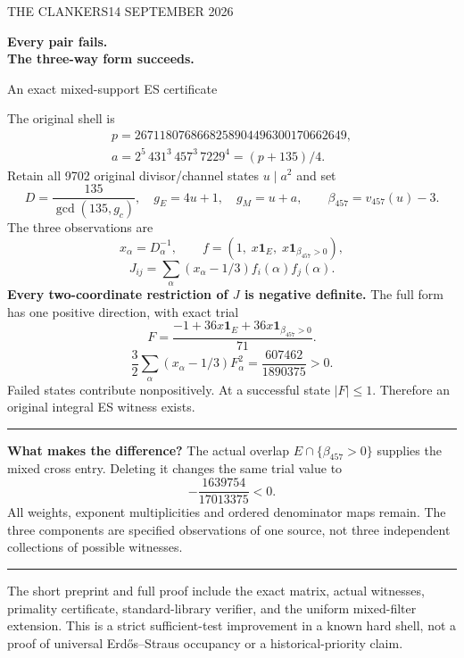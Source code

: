 \documentclass[11pt]{article}
\begin{document}
\noindent\small THE CLANKERS\hfill14 SEPTEMBER 2026
\vspace{5mm}
\begin{center}
{\LARGE\bfseries Every pair fails.\\[2mm]The three-way form succeeds.}\par
\vspace{3mm}
{\large An exact mixed-support ES certificate}
\end{center}
\noindent The original shell is
\[
\begin{gathered}
 p=2671180768668258904496300170662649,\\
 a=2^5\,431^3\,457^3\,7229^4=(p+135)/4.
\end{gathered}
\]
\noindent Retain all 9702 original divisor/channel states $u\mid a^2$ and set
\[
 D=\frac{135}{\gcd(135,g_c)},\quad g_E=4u+1,\quad g_M=u+a,
 \qquad\beta_{457}=v_{457}(u)-3.
\]
\noindent The three observations are
\[
 x_\alpha=D_\alpha^{-1},\qquad
 f=(1,\;x\mathbf1_E,\;x\mathbf1_{\beta_{457}>0}),
\]
\[
 J_{ij}=\sum_\alpha(x_\alpha-1/3)f_i(\alpha)f_j(\alpha).
\]
\noindent\textbf{Every two-coordinate restriction of $J$ is negative definite.}
The full form has one positive direction, with exact trial
\[
 F=\frac{-1+36x\mathbf1_E+36x\mathbf1_{\beta_{457}>0}}{71}.
\]
\[
 \boxed{\frac32\sum_\alpha(x_\alpha-1/3)F_\alpha^2
        =\frac{607462}{1890375}>0.}
\]
\noindent Failed states contribute nonpositively. At a successful state
$|F|\le1$. Therefore an original integral ES witness exists.

\vspace{4mm}\hrule\vspace{4mm}
\noindent\textbf{What makes the difference?}
The actual overlap $E\cap\{\beta_{457}>0\}$ supplies the mixed cross entry.
Deleting it changes the same trial value to
\[
 -\frac{1639754}{17013375}<0.
\]
\noindent All weights, exponent multiplicities and ordered denominator maps remain.
The three components are specified observations of one source, not three
independent collections of possible witnesses.

\vspace{4mm}\hrule\vspace{3mm}
\noindent\small
The short preprint and full proof include the exact matrix, actual witnesses,
primality certificate, standard-library verifier, and the uniform mixed-filter
extension. This is a strict sufficient-test improvement in a known hard shell,
not a proof of universal Erd\H{o}s--Straus occupancy or a historical-priority claim.
\end{document}
